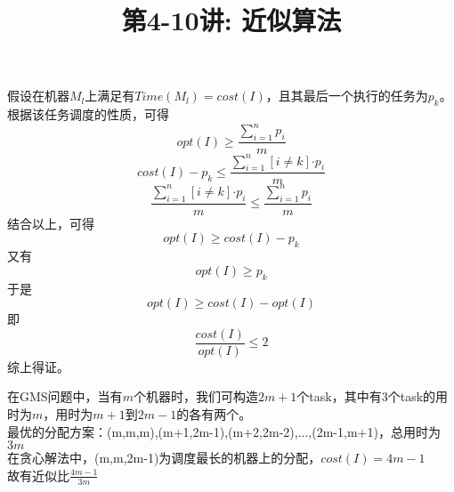 \documentclass[a4paper, justified]{tufte-handout}
\title{第4-10讲: 近似算法}
\date{\zhtoday} %
\begin{document}
\maketitle
\noplagiarism %
\begin{abstract}
\end{abstract}
\beginrequired

\begin{problem}[JH 4.2.1.4]
\end{problem}

\begin{solution}
假设在机器$M_l$上满足有$Time(M_l)=cost(I)$，且其最后一个执行的任务为$p_k$。\\
根据该任务调度的性质，可得
\[
opt(I)\geq\frac{\sum_{i=1}^{n}p_i}{m}
\]
\[
cost(I)-p_k\leq\frac{\sum_{i=1}^{n}[i \neq k]\text{·}p_i}{m}
\]
\[
\frac{\sum_{i=1}^{n}[i \neq k]\text{·}p_i}{m}\leq \frac{\sum_{i=1}^{n}p_i}{m}
\]
结合以上，可得
\[
opt(I)\geq cost(I) - p_k
\]
又有
\[
opt(I)\geq p_k
\]
于是
\[
opt(I)\geq cost(I) - opt(I)
\]
即
\[
\frac{cost(I)}{opt(I)}\leq 2
\]
综上得证。
\end{solution}

\begin{problem}[JH 4.2.1.5]
\end{problem}

\begin{solution}
在GMS问题中，当有$m$个机器时，我们可构造$2m+1$个task，其中有$3$个task的用时为$m$，用时为$m+1$到$2m-1$的各有两个。\\
最优的分配方案：(m,m,m),(m+1,2m-1),(m+2,2m-2),...,(2m-1,m+1)，总用时为$3m$\\
在贪心解法中，(m,m,2m-1)为调度最长的机器上的分配，$cost(I)=4m-1$\\
故有近似比$\frac{4m-1}{3m}$

\end{solution}

\begin{problem}[JH 4.2.3.3]
\end{problem}
\end{document}
